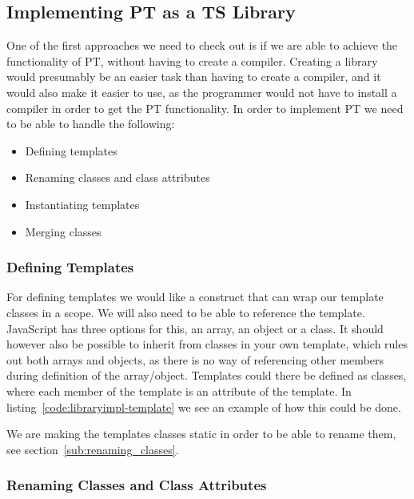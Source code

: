 
\subsection{Implementing PT as a TS Library}\label{subsec:implementing-pt-as-a-ts-library}

One of the first approaches we need to check out is if we are able to achieve the functionality of PT, without having to create a compiler.
Creating a library would presumably be an easier task than having to create a compiler, and it would also make it easier to use, as the programmer would not have to install a compiler in order to get the PT functionality.
In order to implement PT we need to be able to handle the following:

\begin{itemize}
    \item Defining templates
    \item Renaming classes and class attributes
    \item Instantiating templates
    \item Merging classes
\end{itemize}

\subsubsection{Defining Templates}\label{subsubsec:defining-templates}

For defining templates we would like a construct that can wrap our template classes in a scope.
We will also need to be able to reference the template.
JavaScript has three options for this, an array, an object or a class.
It should however also be possible to inherit from classes in your own template, which rules out both arrays and objects, as there is no way of referencing other members during definition of the array/object.
Templates could there be defined as classes, where each member of the template is an attribute of the template.
In listing~\vref{code:libraryimpl-template} we see an example of how this could be done.

We are making the templates classes static in order to be able to rename them, see section~\vref{sub:renaming_classes}.


\subsubsection{Renaming Classes and Class Attributes}\label{subsubsec:renaming-classes-and-class-attributes}

